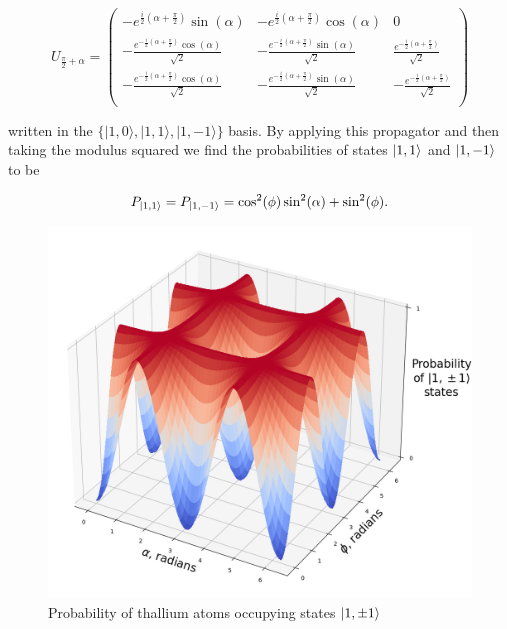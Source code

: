 \begin{equation}
	U_{\frac{\pi}{2} + \alpha} = \begin{pmatrix}
		-e^{\frac{i}{2}(\alpha + \frac{\pi}{2})} \sin(\alpha) & -e^{\frac{i}{2}(\alpha + \frac{\pi}{2})} \cos(\alpha) & 0 \\
	    -\frac{e^{-\frac{i}{2}(\alpha + \frac{\pi}{2})} \cos(\alpha)}{\sqrt{2}} & -\frac{e^{-\frac{i}{2}(\alpha + \frac{\pi}{2})} \sin(\alpha)}{\sqrt{2}} & \frac{e^{-\frac{i}{2}(\alpha + \frac{\pi}{2})}}{\sqrt{2}} \\
	    -\frac{e^{-\frac{i}{2}(\alpha + \frac{\pi}{2})} \cos(\alpha)}{\sqrt{2}} & -\frac{e^{-\frac{i}{2}(\alpha + \frac{\pi}{2})} \sin(\alpha)}{\sqrt{2}} & -\frac{e^{-\frac{i}{2}(\alpha + \frac{\pi}{2})}}{\sqrt{2}} \\
	\end{pmatrix}
\end{equation}

written in the $\{|1, 0 \rangle, |1, 1 \rangle, |1, -1 \rangle\}$ basis. By applying this propagator and then taking the modulus squared we find  the probabilities of states $\ket{1, 1}$ and $\ket{1, -1}$ to be

\begin{equation} \label{final_state_probabilities}
        P_{\ket{1, 1}} = P_{\ket{1, -1}} = \cos^2(\phi) \sin^2(\alpha) + \sin^2(\phi).
\end{equation}

\begin{figure}[h]
    \centering
    \includegraphics[width=150mm,scale=0.5]{images/prob_thallium_atoms.png}
    \caption{Probability of thallium atoms occupying states $\ket{1, \pm 1}$}
    \label{fig:thallium_probability}
\end{figure}

